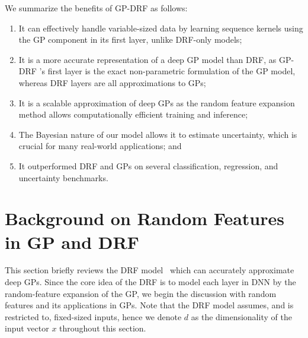 \documentclass[conference]{IEEEtran}
\begin{document}
We summarize the benefits of GP-DRF as follows:
\begin{enumerate}
\item It can effectively handle variable-sized data by learning sequence kernels using the GP component in its first layer, unlike DRF-only models;
\item 
It is a more accurate representation of a deep GP model than DRF, as GP-DRF 's first layer is the exact non-parametric formulation of the GP model, whereas DRF layers are all approximations to GPs;
\item It is a scalable approximation of deep GPs as the random feature expansion method allows computationally efficient training and inference;
\item The Bayesian nature of our model allows it to estimate uncertainty, which is crucial for many real-world applications; and
\item It outperformed DRF and GPs on several classification, regression, and uncertainty benchmarks.
\end{enumerate}



\section{Background on Random Features in GP and DRF}\label{sec:background}
This section briefly reviews the DRF model~\cite{rfdnn17} which can accurately approximate deep GPs. Since the core idea of the DRF is to model each layer in DNN by the random-feature expansion of the GP, we begin the discussion with random features and its applications in GPs. Note that the DRF model assumes, and is restricted to, fixed-sized inputs, hence we denote $d$ as the dimensionality of the input vector $x$ throughout this section.  
\end{document}
